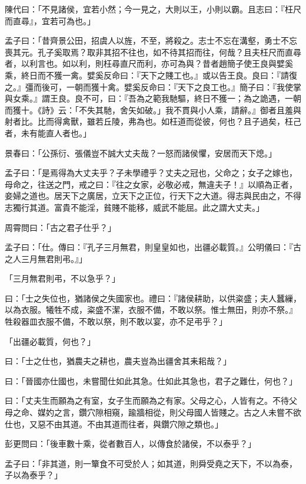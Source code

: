 
\begin{pinyinscope}
陳代曰：「不見諸侯，宜若小然；今一見之，大則以王，小則以霸。且志曰：『枉尺而直尋』，宜若可為也。」

孟子曰：「昔齊景公田，招虞人以旌，不至，將殺之。志士不忘在溝壑，勇士不忘喪其元。孔子奚取焉？取非其招不往也，如不待其招而往，何哉？且夫枉尺而直尋者，以利言也。如以利，則枉尋直尺而利，亦可為與？昔者趙簡子使王良與嬖奚乘，終日而不獲一禽。嬖奚反命曰：『天下之賤工也。』或以告王良。良曰：『請復之。』彊而後可，一朝而獲十禽。嬖奚反命曰：『天下之良工也。』簡子曰：『我使掌與女乘。』謂王良。良不可，曰：『吾為之範我馳驅，終日不獲一；為之詭遇，一朝而獲十。《詩》云：「不失其馳，舍矢如破。」我不貫與小人乘，請辭。』御者且羞與射者比。比而得禽獸，雖若丘陵，弗為也。如枉道而從彼，何也？且子過矣，枉己者，未有能直人者也。」

景春曰：「公孫衍、張儀豈不誠大丈夫哉？一怒而諸侯懼，安居而天下熄。」

孟子曰：「是焉得為大丈夫乎？子未學禮乎？丈夫之冠也，父命之；女子之嫁也，母命之，往送之門，戒之曰：『往之女家，必敬必戒，無違夫子！』以順為正者，妾婦之道也。居天下之廣居，立天下之正位，行天下之大道。得志與民由之，不得志獨行其道。富貴不能淫，貧賤不能移，威武不能屈。此之謂大丈夫。」

周霄問曰：「古之君子仕乎？」

孟子曰：「仕。傳曰：『孔子三月無君，則皇皇如也，出疆必載質。』公明儀曰：『古之人三月無君則弔。』」

「三月無君則弔，不以急乎？」

曰：「士之失位也，猶諸侯之失國家也。禮曰：『諸侯耕助，以供粢盛；夫人蠶繅，以為衣服。犧牲不成，粢盛不潔，衣服不備，不敢以祭。惟士無田，則亦不祭。』牲殺器皿衣服不備，不敢以祭，則不敢以宴，亦不足弔乎？」

「出疆必載質，何也？」

曰：「士之仕也，猶農夫之耕也，農夫豈為出疆舍其耒耜哉？」

曰：「晉國亦仕國也，未嘗聞仕如此其急。仕如此其急也，君子之難仕，何也？」

曰：「丈夫生而願為之有室，女子生而願為之有家。父母之心，人皆有之。不待父母之命、媒妁之言，鑽穴隙相窺，踰牆相從，則父母國人皆賤之。古之人未嘗不欲仕也，又惡不由其道。不由其道而往者，與鑽穴隙之類也。」

彭更問曰：「後車數十乘，從者數百人，以傳食於諸侯，不以泰乎？」

孟子曰：「非其道，則一簞食不可受於人；如其道，則舜受堯之天下，不以為泰，子以為泰乎？」


\end{pinyinscope}
